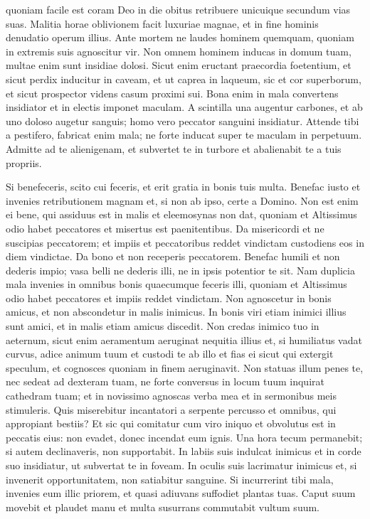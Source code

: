 \begin{biblechapter}
\verse quoniam facile est coram Deo in die obitus retribuere unicuique secundum vias suas. 
\verse Malitia horae oblivionem facit luxuriae magnae, et in fine hominis denudatio operum illius. 
\verse Ante mortem ne laudes hominem quemquam, quoniam in extremis suis agnoscitur vir. 
\verse Non omnem hominem inducas in domum tuam, multae enim sunt insidiae dolosi. 
\verse Sicut enim eructant praecordia foetentium, et sicut perdix inducitur in caveam, et ut caprea in laqueum, sic et cor superborum, et sicut prospector videns casum proximi sui. 
\verse Bona enim in mala convertens insidiator et in electis imponet maculam. 
\verse A scintilla una augentur carbones, et ab uno doloso augetur sanguis; homo vero peccator sanguini insidiatur. 
\verse Attende tibi a pestifero, fabricat enim mala; ne forte inducat super te maculam in perpetuum. 
\verse Admitte ad te alienigenam, et subvertet te in turbore et abalienabit te a tuis propriis. 
\end{biblechapter}

\begin{biblechapter}  
\verse Si benefeceris, scito cui feceris, et erit gratia in bonis tuis multa. 
\verse Benefac iusto et invenies retributionem magnam et, si non ab ipso, certe a Domino. 
\verse Non est enim ei bene, qui assiduus est in malis et eleemosynas non dat, quoniam et Altissimus odio habet peccatores et misertus est paenitentibus. 
\verse Da misericordi et ne suscipias peccatorem; et impiis et peccatoribus reddet vindictam custodiens eos in diem vindictae. 
\verse Da bono et non receperis peccatorem. 
\verse Benefac humili et non dederis impio; vasa belli ne dederis illi, ne in ipsis potentior te sit. 
\verse Nam duplicia mala invenies in omnibus bonis quaecumque feceris illi, quoniam et Altissimus odio habet peccatores et impiis reddet vindictam. 
\verse Non agnoscetur in bonis amicus, et non abscondetur in malis inimicus. 
\verse In bonis viri etiam inimici illius sunt amici, et in malis etiam amicus discedit. 
\verse Non credas inimico tuo in aeternum, sicut enim aeramentum aeruginat nequitia illius 
\verse et, si humiliatus vadat curvus, adice animum tuum et custodi te ab illo et fias ei sicut qui extergit speculum, et cognosces quoniam in finem aeruginavit. 
\verse Non statuas illum penes te, nec sedeat ad dexteram tuam, ne forte conversus in locum tuum inquirat cathedram tuam; et in novissimo agnoscas verba mea et in sermonibus meis stimuleris. 
\verse Quis miserebitur incantatori a serpente percusso et omnibus, qui appropiant bestiis? Et sic qui comitatur cum viro iniquo et obvolutus est in peccatis eius: non evadet, donec incendat eum ignis. 
\verse Una hora tecum permanebit; si autem declinaveris, non supportabit. 
\verse In labiis suis indulcat inimicus et in corde suo insidiatur, ut subvertat te in foveam. 
\verse In oculis suis lacrimatur inimicus et, si invenerit opportunitatem, non satiabitur sanguine. 
\verse Si incurrerint tibi mala, invenies eum illic priorem, 
\verse et quasi adiuvans suffodiet plantas tuas. 
\verse Caput suum movebit et plaudet manu et multa susurrans commutabit vultum suum. 
\end{biblechapter}

